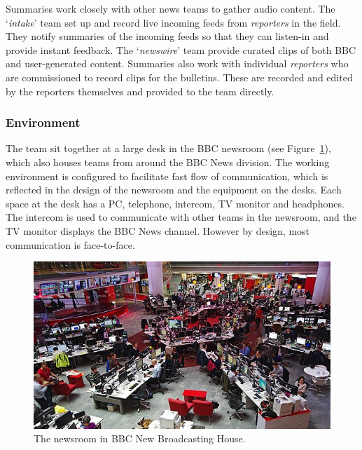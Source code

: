 Summaries work closely with other news teams to gather audio content. The `\textit{intake}' team set up and record live
incoming feeds from \textit{reporters} in the field. They notify summaries of the incoming feeds so that they can
listen-in and provide instant feedback. The `\textit{newswire}' team provide curated clips of both BBC and
user-generated content. Summaries also work with individual \textit{reporters} who are commissioned to record clips for
the bulletins. These are recorded and edited by the reporters themselves and provided to the team directly.

\subsubsection{Environment}
The team sit together at a large desk in the BBC newsroom (see Figure~\ref{fig:newsroom}), which also houses teams from
around the BBC News division.  The working environment is configured to facilitate fast flow of communication, which is
reflected in the design of the newsroom and the equipment on the desks.  Each space at the desk has a PC, telephone,
intercom, TV monitor and headphones. The intercom is used to communicate with other teams in the newsroom, and the TV
monitor displays the BBC News channel. However by design, most communication is face-to-face.

\begin{figure}[p]
  \centering
  \includegraphics[width=\columnwidth]{figs/newsroom.jpg}
  \caption{The newsroom in BBC New Broadcasting House.}
  \label{fig:newsroom}
\end{figure}

